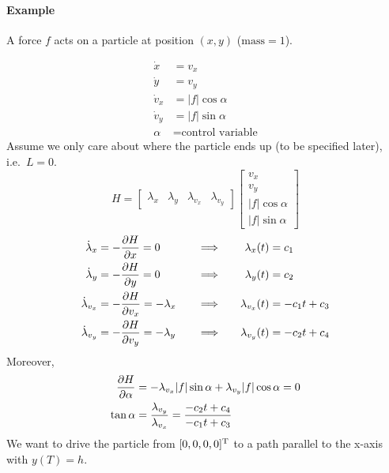 \paragraph{Example} \mbox{}

A force $f$ acts on a particle at position $(x,y)$ ($\text{mass}=1$).

\begin{center}
\end{center}
\begin{align}
  \dot x &= v_x \\
  \dot y &= v_y \\
  \dot v_x &= |f|\cos\alpha \\
  \dot v_y &= |f|\sin\alpha \\
  \alpha &= \text{control variable}
\end{align}
Assume we only care about where the particle ends up (to be specified later), i.e.\ $L=0$.
\[
  H = \begin{bmatrix}
    \lambda_x & \lambda_y & \lambda_{v_x} & \lambda_{v_y}
  \end{bmatrix}
  \begin{bmatrix}
    v_x \\ v_y \\ |f|\cos\alpha \\ |f|\sin\alpha
  \end{bmatrix}
\]
\begin{alignat}{3}
  \dot\lambda_x &= -\frac{\partial H}{\partial x} = 0 && \Longrightarrow & \lambda_x(t) &= c_1 \\
  \dot\lambda_y &= -\frac{\partial H}{\partial y} = 0 && \Longrightarrow & \lambda_y(t) &= c_2 \\
  \dot\lambda_{v_x} &= -\frac{\partial H}{\partial v_x} = -\lambda_x && \Longrightarrow & \lambda_{v_x}(t) &= -c_1 t + c_3 \\
  \dot\lambda_{v_y} &= -\frac{\partial H}{\partial v_y} = -\lambda_y \quad && \Longrightarrow & \quad \lambda_{v_y}(t) &= -c_2 t + c_4
\end{alignat}
Moreover,
\begin{align}
  \frac{\partial H}{\partial \alpha} &= -\lambda_{v_x} |f| \sin\alpha + \lambda_{v_y} |f| \cos\alpha = 0 \\
  \tan\alpha &= \frac{\lambda_{v_y}}{\lambda_{v_x}} = \frac{-c_2t+c_4}{-c_1t+c_3}
\end{align}
We want to drive the particle from $[0,0,0,0]^\text{T}$ to a path parallel to the x-axis with $y(T)=h$.

